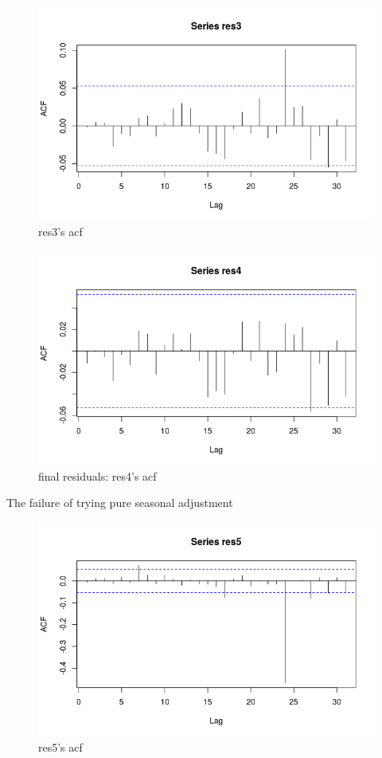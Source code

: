 \documentclass[a4paper,10pt]{article}
\begin{document}
\begin{figure}[H]
\centering
\caption{res3's acf}
\includegraphics[scale=.40]{res3_acf.png}
\end{figure}



\begin{figure}[H]
\centering
\caption{final residuals: res4's acf}
\includegraphics[scale=.40]{final_residuals_acf.png}
\end{figure}

The failure of trying pure seasonal adjustment

\begin{figure}[H]
\centering
\caption{res5's acf}
\includegraphics[scale=.40]{res5_acf.png}
\end{figure}
\end{document}
